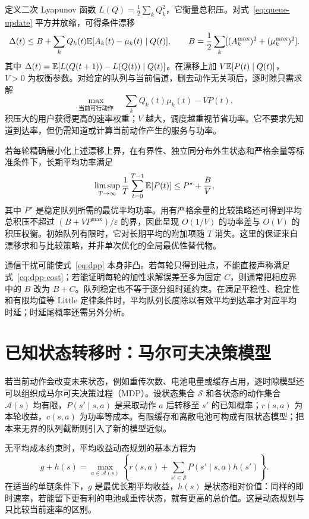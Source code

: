 定义二次 Lyapunov 函数 $L(Q)=\tfrac12\sum_kQ_k^2$，它衡量总积压。对式~\eqref{eq:queue-update} 平方并放缩，可得条件漂移
\begin{equation}
 \Delta(t)\le B+\sum_k Q_k(t)
 \mathbb E[A_k(t)-\mu_k(t)\mid Q(t)],\qquad
 B=\frac12\sum_k[(A_k^{\max})^2+(\mu_k^{\max})^2].
\end{equation}
其中 $\Delta(t)=\mathbb E[L(Q(t+1))-L(Q(t))\mid Q(t)]$。在漂移上加 $V\mathbb E[P(t)\mid Q(t)]$，$V>0$ 为权衡参数。对给定的队列与当前信道，删去动作无关项后，逐时隙只需求解\cite{neely2010}
\begin{equation}
 \max_{\text{当前可行动作}}\quad
 \sum_k Q_k(t)\mu_k(t)-V P(t).
 \label{eq:dpp}
\end{equation}
积压大的用户获得更高的速率权重；$V$ 越大，调度越重视节省功率。它不要求先知道到达率，但仍需知道或计算当前动作产生的服务与功率。

若每轮精确最小化上述漂移上界，在有界性、独立同分布外生状态和严格余量等标准条件下，长期平均功率满足
\begin{equation}
 \limsup_{T\to\infty}\frac1T\sum_{t=0}^{T-1}\mathbb E[P(t)]
 \le P^\star+\frac BV,
 \label{eq:dpp-cost}
\end{equation}
其中 $P^\star$ 是稳定队列所需的最优平均功率。用有严格余量的比较策略还可得到平均总积压不超过 $(B+VP^{\max})/\varepsilon$ 的界，因此呈现 $O(1/V)$ 的功率差与 $O(V)$ 的积压权衡。初始队列有限时，它对长期平均的附加项随 $T$ 消失。这里的保证来自漂移求和与比较策略，并非单次优化的全局最优性替代物。

通信干扰可能使式~\eqref{eq:dpp} 本身非凸。若每轮只得到驻点，不能直接声称满足式~\eqref{eq:dpp-cost}；若能证明每轮的加性求解误差至多为固定 $C$，则通常把相应界中的 $B$ 改为 $B+C$。队列稳定也不等于逐分组时延约束。在满足平稳性、稳定性和有限均值等 Little 定律条件时，平均队列长度除以有效平均到达率才对应平均时延；时延尾概率还需另外分析。

\section{已知状态转移时：马尔可夫决策模型}
若当前动作会改变未来状态，例如重传次数、电池电量或缓存占用，逐时隙模型还可以组织成马尔可夫决策过程（MDP）。设状态集合 $\mathcal S$ 和各状态的动作集合 $\mathcal A(s)$ 均有限，$P(s'\mid s,a)$ 是采取动作 $a$ 后转移至 $s'$ 的已知概率；$r(s,a)$ 为本轮收益，$c(s,a)$ 为功率等成本。有限缓存和离散电池可构成有限状态模型；把本来无界的队列截断则引入了新的模型近似。

无平均成本约束时，平均收益动态规划的基本方程为
\begin{equation}
 g+h(s)=\max_{a\in\mathcal A(s)}
 \left\{r(s,a)+\sum_{s'\in\mathcal S}P(s'\mid s,a)h(s')\right\}.
\end{equation}
在适当的单链条件下，$g$ 是最优长期平均收益，$h(s)$ 是状态相对价值：同样的即时速率，若能留下更有利的电池或重传状态，就有更高的总价值。这是动态规划与只比较当前速率的区别\cite{puterman1994}。

